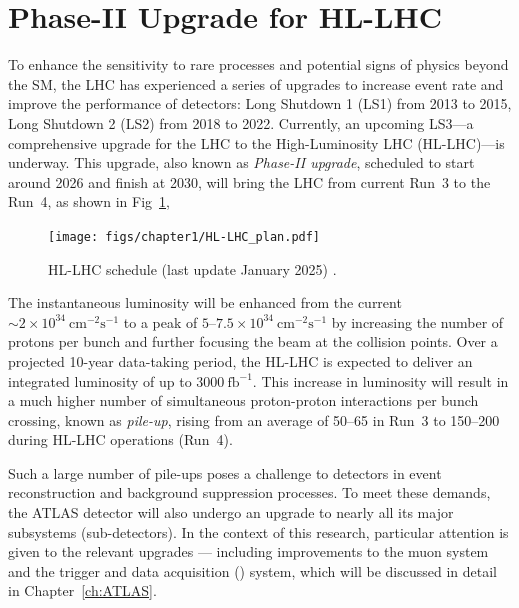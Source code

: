 \section{Phase-II Upgrade for HL-LHC} \label{sec:upgrade}
To enhance the sensitivity to rare processes and potential signs of physics beyond the SM, the LHC has experienced a series of upgrades to increase event rate and improve the performance of detectors: Long Shutdown 1 (LS1) from 2013 to 2015, Long Shutdown 2 (LS2) from 2018 to 2022. Currently, an upcoming LS3---a comprehensive upgrade for the LHC to the High-Luminosity LHC (HL-LHC)---is underway. This upgrade, also known as \textit{Phase-II upgrade}, scheduled to start around 2026 and finish at 2030, will bring the LHC from current Run~3 to the Run~4, as shown in Fig~\ref{fig:HL-LHC},

\begin{figure}[htbp]
  \centering
  \texttt{[image: figs/chapter1/HL-LHC\_plan.pdf]}
  \caption{HL-LHC schedule (last update January 2025) \cite{HL-LHC}.}
  \label{fig:HL-LHC}
\end{figure}

The instantaneous luminosity will be enhanced from the current $\sim 2 \times 10^{34}~\mathrm{cm}^{-2}\mathrm{s}^{-1}$ to a peak of $5$–$7.5 \times 10^{34}~\mathrm{cm}^{-2}\mathrm{s}^{-1}$ by increasing the number of protons per bunch and further focusing the beam at the collision points. Over a projected 10-year data-taking period, the HL-LHC is expected to deliver an integrated luminosity of up to $3000~\mathrm{fb}^{-1}$. This increase in luminosity will result in a much higher number of simultaneous proton-proton interactions per bunch crossing, known as \textit{pile-up}, rising from an average of 50–65 in Run~3 to 150–200 during HL-LHC operations (Run~4).

Such a large number of pile-ups poses a challenge to detectors in event reconstruction and background suppression processes. To meet these demands, the ATLAS detector will also undergo an upgrade to nearly all its major subsystems (sub-detectors). In the context of this research, particular attention is given to the relevant upgrades — including improvements to the muon system and the trigger and data acquisition (\TDAQ) system, which will be discussed in detail in Chapter~\ref{ch:ATLAS}.

